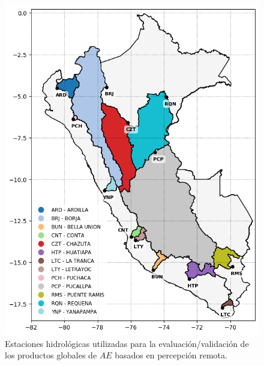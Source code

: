 \begin{figure}[p]
	\centering
	\includegraphics[scale=.98]{Images/00_evaluation_basins.png}
	\caption{Estaciones hidrológicas utilizadas para la evaluación/validación de los productos globales de $AE$ basados en percepción remota.}
	\label{fig:00_all_basins}
\end{figure}